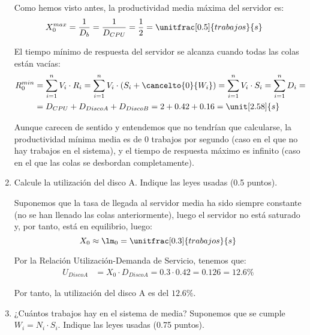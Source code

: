 \documentclass[12pt]{article}
\begin{document}
\begin{ejercicio}[2 puntos]
\begin{enumerate}
            Como hemos visto antes, la productividad media máxima del servidor es:
            \begin{align*}
                X_0^{max} &= \frac{1}{D_b} = \frac{1}{D_{CPU}} = \frac{1}{2} = \unitfrac[0.5]{trabajos}{s}
            \end{align*}

            El tiempo mínimo de respuesta del servidor se alcanza cuando todas las colas están vacías:
            \begin{align*}
                R_{0}^{min} &= \sum_{i=1}^{n} V_i\cdot R_i = \sum_{i=1}^{n} V_i\cdot (S_i + \cancelto{0}{W_i})
                = \sum_{i=1}^{n} V_i\cdot S_i
                = \sum_{i=1}^{n} D_i
                =\\&= D_{CPU} + D_{Disco A} + D_{Disco B} = 2 + 0.42 + 0.16 = \unit[2.58]{s}
            \end{align*}

            Aunque carecen de sentido y entendemos que no tendrían que calcularse, la productividad mínima media es de $0$ trabajos por segundo (caso en el que no hay trabajos en el sistema), y el tiempo de respuesta máximo es infinito (caso en el que las colas se desbordan completamente).
            \item Calcule la utilización del disco A. Indique las leyes usadas (0.5 puntos).
            
            Suponemos que la tasa de llegada al servidor media ha sido siempre constante (no se han llenado las colas anteriormente), luego el servidor no está saturado y, por tanto, está en equilibrio, luego:
            \begin{equation*}
                X_0 \approx \lm_0 = \unitfrac[0.3]{trabajos}{s}
            \end{equation*}

            Por la Relación Utilización-Demanda de Servicio, tenemos que:
            \begin{align*}
                U_{Disco A} &= X_0\cdot D_{Disco A} = 0.3\cdot 0.42 = 0.126 = 12.6\%
            \end{align*}

            Por tanto, la utilización del disco A es del $12.6\%$.
            
            
            \item ¿Cuántos trabajos hay en el sistema de media? Suponemos que se cumple $W_i = N_i\cdot S_i$. Indique las leyes usadas (0.75 puntos).
            

\end{enumerate}
\end{ejercicio}
\end{document}
